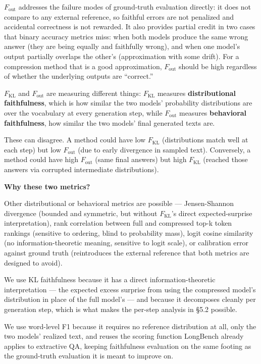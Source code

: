 \documentclass[10pt,letterpaper]{article}
\begin{document}
\(F_{\text{out}}\) addresses the failure modes of ground-truth
evaluation directly: it does not compare to any external reference, so
faithful errors are not penalized and accidental correctness is not
rewarded. It also provides partial credit in two cases that binary
accuracy metrics miss: when both models produce the same wrong answer
(they are being equally and faithfully wrong), and when one model's
output partially overlaps the other's (approximation with some drift).
For a compression method that is a good approximation,
\(F_{\text{out}}\) should be high regardless of whether the underlying
outputs are ``correct.''

\(F_{\text{KL}}\) and \(F_{\text{out}}\) are measuring different things:
\(F_{\text{KL}}\) measures \textbf{distributional faithfulness}, which is how
similar the two models' probability distributions are over the
vocabulary at every generation step, while \(F_{\text{out}}\) measures
\textbf{behavioral faithfulness}, how similar the two models' final
generated texts are.

These can disagree. A method could have low \(F_{\text{KL}}\)
(distributions match well at each step) but low \(F_{\text{out}}\) (due
to early divergence in sampled text). Conversely, a method could have
high \(F_{\text{out}}\) (same final answers) but high \(F_{\text{KL}}\)
(reached those answers via corrupted intermediate distributions).

\textbf{Why these two metrics?}

Other distributional or behavioral
metrics are possible --- Jensen-Shannon divergence (bounded and
symmetric, but without \(F_{\text{KL}}\)'s direct expected-surprise
interpretation), rank correlation between full and compressed top-k
token rankings (sensitive to ordering, blind to probability mass), logit
cosine similarity (no information-theoretic meaning, sensitive to logit
scale), or calibration error against ground truth (reintroduces the
external reference that both metrics are designed to avoid).

We use KL faithfulness because it has a direct information-theoretic
interpretation --- the expected excess surprise from using the
compressed model's distribution in place of the full model's --- and
because it decomposes cleanly per generation step, which is what makes
the per-step analysis in §5.2 possible.

We use word-level F1 because it requires no reference distribution at
all, only the two models' realized text, and reuses the scoring function
LongBench already applies to extractive QA, keeping faithfulness
evaluation on the same footing as the ground-truth evaluation it is
meant to improve on.
\end{document}
